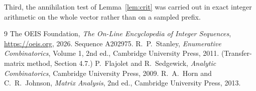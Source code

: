 \documentclass[11pt,a4paper]{article}
\theoremstyle{plain}
\theoremstyle{definition}
\begin{document}
Third, the annihilation test of Lemma~\ref{lem:crit} was carried out in exact integer
arithmetic on the whole vector rather than on a sampled prefix.

\begin{thebibliography}{9}
 The OEIS Foundation, \emph{The On-Line Encyclopedia of Integer
Sequences}, \url{https://oeis.org}, 2026. Sequence A202975.
 R.~P.~Stanley, \emph{Enumerative Combinatorics}, Volume 1, 2nd ed.,
Cambridge University Press, 2011. (Transfer-matrix method, Section 4.7.)
 P.~Flajolet and R.~Sedgewick, \emph{Analytic Combinatorics}, Cambridge
University Press, 2009.
 R.~A.~Horn and C.~R.~Johnson, \emph{Matrix Analysis}, 2nd ed., Cambridge
University Press, 2013.
\end{thebibliography}
\end{document}
